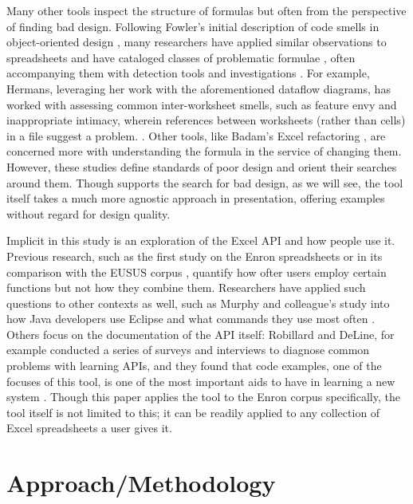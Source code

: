 \documentclass[conference]{IEEEtran}
\begin{document}
	Many other tools inspect the structure of formulas but often from the
	perspective of finding bad design.  Following Fowler's initial description of
	code smells in object-oriented design \cite{fowler2009refactoring}, many
	researchers have applied similar observations to spreadsheets and have
	cataloged classes of problematic formulae \cite{hermans2012detecting}
	\cite{cunha2012towards} \cite{asavametha2012detecting}, often accompanying them
	with detection tools \cite{abreu2014smelling} and investigations
	\cite{jansen2015code}. For example, Hermans, leveraging her work with the
	aforementioned dataflow diagrams, has worked with assessing common
	inter-worksheet smells, such as feature envy and inappropriate intimacy,
	wherein references between worksheets (rather than cells) in a file suggest a
	problem. \cite{hermans2012detectinginter}. Other tools, like Badam's Excel
	refactoring \cite{badame2012refactoring}, are concerned more with understanding
	the formula in the service of changing them. However, these studies define
	standards of poor design and orient their searches around them. Though
	\toolname supports the search for bad design, as we will see, the tool itself
	takes a much more agnostic approach in presentation, offering examples without
	regard for design quality. \par
	
	Implicit in this study is an exploration of the Excel API and how people use
	it. Previous research, such as the first study on the Enron spreadsheets
	\cite{hermans2015enron} or in its comparison with the EUSUS corpus
	\cite{jansen2015enron}, quantify how ofter users employ certain functions but
	not how they combine them. Researchers have applied such questions to other
	contexts as well, such as Murphy and colleague's study into how Java developers
	use Eclipse and what commands they use most often \cite{murphy2006java}. Others
	focus on the documentation of the API itself: Robillard and DeLine, for example
	conducted a series of surveys and interviews to diagnose common problems with
	learning APIs, and they found that code examples, one of the focuses of this
	tool, is one of the most important aids to have in learning a new system
	\cite{robillard2011field}. Though this paper applies the tool to the Enron
	corpus specifically, the tool itself is not limited to this; it can be readily
	applied to any collection of Excel spreadsheets a user gives it.
	
	\section{Approach/Methodology}
	
\end{document}
